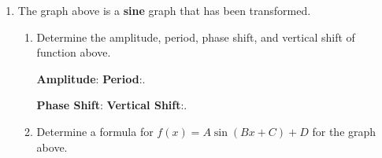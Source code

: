 \begin{enumerate}
\item  The graph above is a \textbf{sine} graph that has been transformed.   
\begin{enumerate}

\item  Determine the amplitude, period, phase shift, and vertical shift of function above.

{\bf Amplitude}: \hfill {\bf Period}:\hfill.

\vspace{1cm}

{\bf Phase Shift}: \hfill {\bf Vertical Shift}:\hfill.


\vspace{1cm}
\item  Determine a formula for $f(x)=A\sin(Bx+C)+D$ for the graph above. \vfill
	\vfill
 


\end{enumerate}



\end{enumerate}



